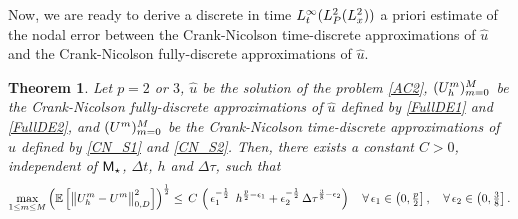 \documentclass[10pt]{amsart}
\newtheorem{theorem}{Theorem}[section]
\numberwithin{equation}{section}
\begin{document}
Now, we are ready to derive a discrete in time $L^{\infty}_t(L^2_{{\scriptscriptstyle} P}(L^2_x))$ a priori estimate
of the nodal error between the Crank-Nicolson time-discrete approximations of ${\widehat u}$ and
the Crank-Nicolson fully-discrete approximations of ${\widehat u}$.
\begin{theorem}\label{Tigrakis}
Let $p=2$ or $3$, ${\widehat u}$ be the solution of the problem
\eqref{AC2}, $(U_h^m)_{m=0}^{{\scriptscriptstyle} M}$ be the Crank-Nicolson
fully-discrete approximations of ${\widehat u}$ defined by \eqref{FullDE1} and
\eqref{FullDE2},
and $(U^m)_{m=0}^{{\scriptscriptstyle} M}$ be the Crank-Nicolson time-discrete
approximations of ${\widehat u}$ defined by \eqref{CN_S1} and \eqref{CN_S2}.
Then, there exists a constant $C>0$, independent of ${\sf M}_{\star}$,
${\Delta t}$, $h$ and ${\Delta\tau}$,  such that
\begin{equation}\label{Lasso1}
\max_{1\leq{m}\leq {{\scriptscriptstyle} M}}\left({\mathbb E}\left[
\big\|U_h^m-U^m\big\|^2_{{\scriptscriptstyle} 0,D}\right]\right)^{\frac{1}{2}}
\leq\,C\,\left(\,\epsilon_1^{-{\frac{1}{2}}}\,\,\,h^{\frac{p}{2}-\epsilon_1}
+\epsilon_2^{-\frac{1}{2}}\,{\Delta\tau}^{\frac{3}{8}-\epsilon_2}\right)
\quad\forall\,\epsilon_1\in\left(0,\tfrac{p}{2}\right],
\quad\forall\,\epsilon_2\in\left(0,\tfrac{3}{8}\right].
\end{equation}
\end{theorem}
\end{document}
